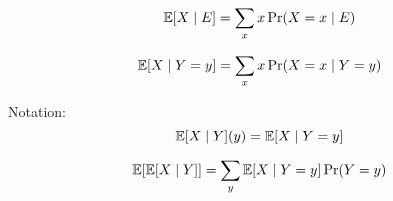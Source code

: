 
\begin{frame}{}
  \centerline{}

  \begin{definition}
    \[
      \operatorname*{\mathbb{E}}[X \mid E] = \sum_{x} x \Pr(X = x \mid E)
    \]
  \end{definition}

  \pause
  \vspace{0.50cm}
  \begin{definition}
    \[
      \operatorname*{\mathbb{E}}[X \mid Y = y] = \sum_{x} x \Pr(X = x \mid Y = y)
    \]
  \end{definition}

  \begin{alertblock}{Notation:}
    \[
      \operatorname*{\mathbb{E}}[X \mid Y](y) = \operatorname*{\mathbb{E}}[X \mid Y = y]
    \]
  \end{alertblock}

  \pause
  \[
    \operatorname*{\mathbb{E}}[\operatorname*{\mathbb{E}}[X \mid Y]] = \sum_{y} \operatorname*{\mathbb{E}}[X \mid Y = y] \Pr(Y = y)
  \]
\end{frame}

